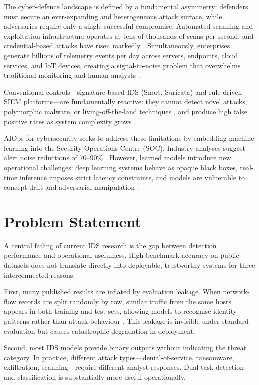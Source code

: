 \documentclass[12pt,a4paper]{report}
\begin{document}
The cyber-defence landscape is defined by a fundamental asymmetry: defenders must secure an ever-expanding and heterogeneous attack surface, while adversaries require only a single successful compromise. Automated scanning and exploitation infrastructure operates at tens of thousands of scans per second, and credential-based attacks have risen markedly \cite{fortinet2025}. Simultaneously, enterprises generate billions of telemetry events per day across servers, endpoints, cloud services, and IoT devices, creating a signal-to-noise problem that overwhelms traditional monitoring and human analysts \cite{dang2019}.

Conventional controls---signature-based IDS (Snort, Suricata) and rule-driven SIEM platforms---are fundamentally reactive: they cannot detect novel attacks, polymorphic malware, or living-off-the-land techniques \cite{ahmad2021}, and produce high false positive rates as system complexity grows \cite{zhu2023}.

AIOps for cybersecurity seeks to address these limitations by embedding machine learning into the Security Operations Centre (SOC). Industry analyses suggest alert noise reductions of 70--90\% \cite{dang2023,nguyen2024}. However, learned models introduce new operational challenges: deep learning systems behave as opaque black boxes, real-time inference imposes strict latency constraints, and models are vulnerable to concept drift and adversarial manipulation \cite{schwarzschild2021,goldblum2023}.

\section{Problem Statement}
\label{sec:problem}

A central failing of current IDS research is the gap between detection performance and operational usefulness. High benchmark accuracy on public datasets does not translate directly into deployable, trustworthy systems for three interconnected reasons.

First, many published results are inflated by evaluation leakage. When network-flow records are split randomly by row, similar traffic from the same hosts appears in both training and test sets, allowing models to recognise identity patterns rather than attack behaviour \cite{turcotte2018}. This leakage is invisible under standard evaluation but causes catastrophic degradation in deployment.

Second, most IDS models provide binary outputs without indicating the threat category. In practice, different attack types---denial-of-service, ransomware, exfiltration, scanning---require different analyst responses. Dual-task detection and classification is substantially more useful operationally.
\end{document}
